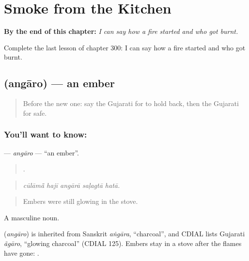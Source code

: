 
\chapter{Smoke from the Kitchen}
\label{ch:gu-smoke-from-the-kitchen}

\begin{chapteropening}
\textbf{By the end of this chapter:} \emph{I can say how a fire started and who got burnt.}

Complete the last lesson of chapter 300: I can say how a fire started and who got burnt.
\end{chapteropening}

\section[\texorpdfstring{\gu{અંગારો} (angāro)}{અંગારો (angāro)}]{ (angāro) — an ember}

\label{lesson:GU-C300-angaro}



\begin{quote}
Before the new one: say the Gujarati for to hold back, then the Gujarati for safe.
\end{quote}

\subsection*{You'll want to know: }
\textbf{} — \emph{angāro} — \textquotedblleft{}an ember\textquotedblright{}.

\begin{quote}
    .
\end{quote}

\begin{quote}
\emph{cūlāmā̃ hajī angārā saḷagtā hatā.}
\end{quote}

\begin{quote}
Embers were still glowing in the stove.
\end{quote}

A masculine noun.

\begin{cousinweb}
\textbf{} (\emph{angāro}) is inherited from Sanskrit \emph{aṅgāra}, \textquotedblleft{}charcoal\textquotedblright{}, and CDIAL lists Gujarati \emph{ãgāro}, \textquotedblleft{}glowing charcoal\textquotedblright{} (CDIAL 125). Embers stay in a stove after the flames have gone: \textbf{}.
\end{cousinweb}

